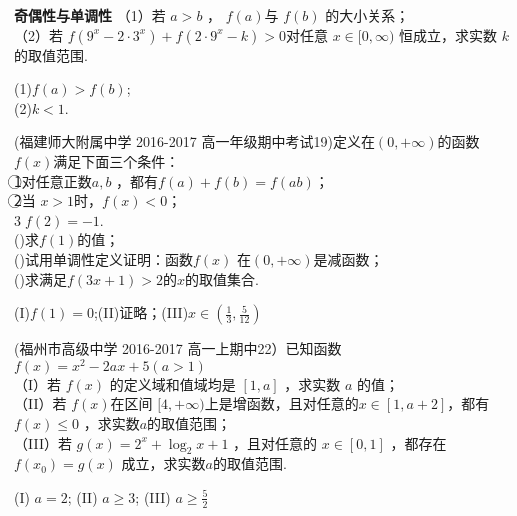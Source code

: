 \begin{exercise}{\bf 奇偶性与单调性}
      （1）若 $a> b$ ， $f (a ) $与 $f (b)$ 的大小关系；\\
      （2）若 $f (9^x- 2\cdot 3^x )+ f ( 2\cdot 9^x-k )> 0 $对任意 $x\in[0,\infty )$ 恒成立，求实数 $k$ 的取值范围.\\
      \begin{answer}
      (1)$f(a)>f(b)$;\\
      (2)$k<1$.\\
      \end{answer}
    \vspace{15em}
    \item
      (福建师大附属中学 2016-2017 高一年级期中考试19)定义在$(0,+\infty)$的函数$f(x)$满足下面三个条件：\\ \textcircled{1}对任意正数$a,b$ ，都有$f(a)+f(b)=f(ab)$；\\
      \textcircled{2}当 $x>1$时，$f(x)<0$；\\
      \textcircled{3}$f(2)=-1$.\\
      ()求$f(1)$的值；\\
      ()试用单调性定义证明：函数$f(x)$ 在$(0,+\infty)$是减函数； \\
      ()求满足$f(3x+1)>2$的$x$的取值集合.
      \begin{answer}
      (I)$f(1)=0$;(II)证略；(III)$x\in(\frac13,\frac5{12})$
      \end{answer}
    \vspace{18em}
    \item%
      (福州市高级中学 2016-2017 高一上期中22）已知函数$f(x)=x^2-2ax+5(a>1)$\\
      （I）若 $f (x )$ 的定义域和值域均是 $[1, a]$ ，求实数 $a$ 的值； \\
      （II）若 $f (x ) $在区间 $[4,+\infty)$上是增函数，且对任意的$ x \in[1, a+ 2]$，都有 $f( x )\leq 0$ ，求实数$a$的取值范围；\\
      （III）若 $g( x )=2^x+\log_2{x+ 1 }$ ，且对任意的 $x \in[0,1]$ ，都存在$f(x_0)=g(x)$ 成立，求实数$a$的取值范围.\\
      \begin{answer}
      (I) $a=2$; (II) $a\geq3$; (III) $a\geq\frac52$
      \end{answer}
    \vspace{18em}
  \end{exercise}

{\hspace{2em}}
{\hspace{2em}}
{\hspace{2em}}
{\hspace{2em}}
\stopexercise
